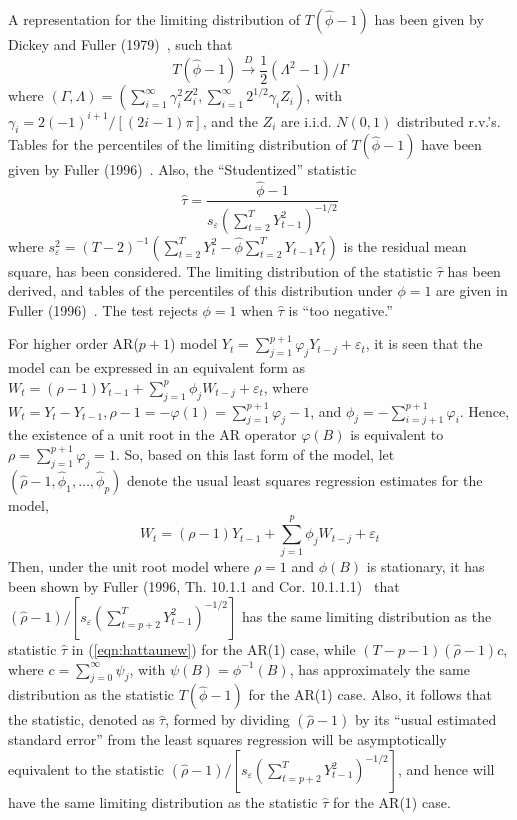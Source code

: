 A representation for the limiting distribution of $T(\hat{\phi} - 1)$ has been given by Dickey and Fuller (1979)~\cite{dickey1979}, such that
	\begin{equation}\label{eqn:futurerefsec}
	T(\hat{\phi} - 1) \xrightarrow{D} \frac{1}{2}(\Lambda^2 - 1)/\Gamma
	\end{equation}
where $(\Gamma,\Lambda) = (\sum_{i=1}^\infty\gamma_i^2Z_i^2, \sum_{i=1}^\infty2^{1/2}\gamma_iZ_i)$, with $\gamma_i = 2(-1)^{i+1}/[(2i - 1)\pi]$, and the $Z_i$ are i.i.d. $N(0,1)$ distributed r.v.'s.
Tables for the percentiles of the limiting distribution of $T(\hat{\phi} - 1)$ have been given by Fuller (1996)~\cite{fuller1996}. Also, the ``Studentized'' statistic
	\begin{equation}\label{eqn:hattaunew}
	\hat{\tau} = \dfrac{\hat{\phi} - 1}{s_{\varepsilon}\left(\sum_{t=2}^T Y_{t-1}^2\right)^{-1/2}}
	\end{equation}
where $s_\varepsilon^2 = (T - 2)^{-1}(\sum_{t=2}^T Y_t^2 - \hat{\phi}\sum_{t=2}^T Y_{t-1}Y_t)$ is the residual mean square, has been considered. The limiting distribution of the statistic $\hat{\tau}$ has been derived, and tables of the percentiles of this distribution under $\phi = 1$ are given in Fuller (1996)~\cite{fuller1996}. The test rejects $\phi = 1$ when $\hat{\tau}$ is ``too negative.''


For higher order AR($p+1$) model $Y_t = \sum_{j=1}^{p+1}\varphi_jY_{t-j} + \varepsilon_t$, it is seen that the model can be expressed in an equivalent form as $W_t = (\rho - 1)Y_{t-1} + \sum_{j=1}^p\phi_jW_{t-j} + \varepsilon_t$, where $W_t = Y_t - Y_{t-1}, \rho - 1 = -\varphi(1) = \sum_{j=1}^{p+1}\varphi_j - 1$, and $\phi_j = -\sum_{i=j+1}^{p+1}\varphi_i$. Hence, the existence of a unit root in the AR operator $\varphi(B)$ is equivalent to $\rho = \sum_{j=1}^{p+1}\varphi_j = 1$. So, based on this last form of the model, let $(\hat{\rho} - 1,\hat{\phi}_1,\ldots,\hat{\phi}_p)$ denote the usual least squares regression estimates for the model, 
	\begin{equation}\label{eqn:wtnew}
	W_t  = (\rho - 1)Y_{t-1} + \sum_{j=1}^p\phi_jW_{t-j} + \varepsilon_t 
	\end{equation}
Then, under the unit root model where $\rho = 1$ and $\phi(B)$ is stationary, it has been shown by Fuller (1996, Th. 10.1.1 and Cor. 10.1.1.1)~\cite{fuller1996} that $(\hat{\rho} - 1)/[s_\varepsilon(\sum_{t=p+2}^TY_{t-1}^2)^{-1/2}]$ has the same limiting distribution as the statistic $\hat{\tau}$ in (\ref{eqn:hattaunew}) for the AR(1) case, while $(T- p - 1)(\hat{\rho} - 1)c$, where $c = \sum_{j=0}^\infty\psi_j$, with $\psi(B) = \phi^{-1}(B)$, has approximately the same distribution as the statistic $T(\hat{\phi} - 1)$ for the AR(1) case. Also, it follows that the statistic, denoted as $\hat{\tau}$, formed by dividing $(\hat{\rho} - 1)$ by its ``usual estimated standard error'' from the least squares regression will be asymptotically equivalent to the statistic $(\hat{\rho} - 1)/[s_{\varepsilon}(\sum_{t=p+2}^T Y_{t-1}^2)^{-1/2}]$, and hence will have the same limiting distribution as the statistic $\hat{\tau}$ for the AR(1) case.


